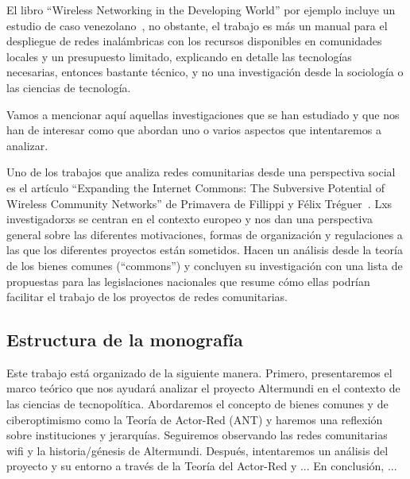 El libro ``Wireless Networking in the Developing World'' por ejemplo incluye un estudio de caso venezolano~\autocite[437-452]{WNDW2013}, no obstante, el trabajo es más un manual para el despliegue de redes inalámbricas con los recursos disponibles en comunidades locales y un presupuesto limitado, explicando en detalle las tecnologías necesarias, entonces bastante técnico, y no una investigación desde la sociología o las ciencias de tecnología.

Vamos a mencionar aquí aquellas investigaciones que se han estudiado y que nos han de interesar como que abordan uno o varios aspectos que intentaremos a analizar.

Uno de los trabajos que analiza redes comunitarias desde una perspectiva social es el artículo ``Expanding the Internet Commons: The Subversive Potential of Wireless Community Networks'' de Primavera de Fillippi y Félix Tréguer~\autocite{FiTre2015}.
Lxs investigadorxs se centran en el contexto europeo y nos dan una perspectiva general sobre las diferentes motivaciones, formas de organización y regulaciones a las que los diferentes proyectos están sometidos.
Hacen un análisis desde la teoría de los bienes comunes (``commons'') y concluyen su investigación con una lista de propuestas para las legislaciones nacionales que resume cómo ellas podrían facilitar el trabajo de los proyectos de redes comunitarias.

\subsection{Estructura de la monografía}

Este trabajo está organizado de la siguiente manera.
Primero, presentaremos el marco teórico que nos ayudará analizar el proyecto Altermundi en el contexto de las ciencias de tecnopolítica.
Abordaremos el concepto de bienes comunes y de ciberoptimismo como la Teoría de Actor-Red (ANT) y haremos una reflexión sobre instituciones y jerarquías.
Seguiremos observando las redes comunitarias wifi y la historia/génesis de Altermundi.
Después, intentaremos un análisis del proyecto y su entorno a través de la Teoría del Actor-Red y ...
En conclusión, ...

